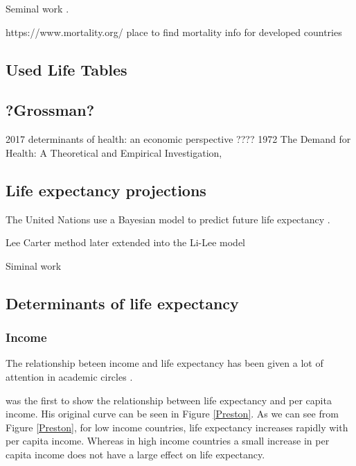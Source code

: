 \documentclass[12pt,a4paper]{article}
\begin{document}
Seminal work \cite{Fergany1971}.

https://www.mortality.org/ place to find mortality info for developed countries


\subsection{Used Life Tables}
\cite{Luy2019}



\subsection{?Grossman?}
2017 determinants of health: an economic perspective  ????
1972 The Demand for Health: A Theoretical and Empirical Investigation,

\cite{Grossman2000}

\subsection{Life expectancy projections}

The United Nations use a Bayesian model to predict future life expectancy \citep{Raftery2014}.

Lee Carter method \cite{Shang2011} later extended into the Li-Lee model

Siminal work \cite{Lee1992}

\cite{Bongaarts2005}

\subsection{Determinants of life expectancy}



\subsubsection{Income} \label{income}

The relationship beteen income and life expectancy has been given a lot of attention in academic circles \citep{Preston1975, Hu2015, Chetty2016, Oeppen2019}. 

\cite{Preston1975} was the first to show the relationship between life expectancy and per capita income. His original curve can be seen in Figure \ref{Preston}. As we can see from Figure \ref{Preston}, for low income countries, life expectancy increases rapidly with per capita income. Whereas in high income countries a small increase in per capita income does not have a large effect on life expectancy.
\end{document}
